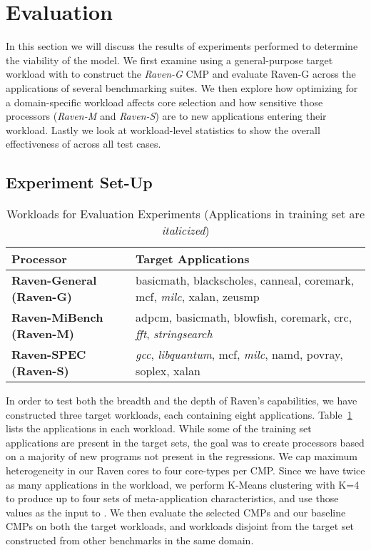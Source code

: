 

\section{Evaluation}
\label{sec:evaluation}

In this section we will discuss the results of experiments performed
to determine the viability of the \Ravan{} model. We first examine
using a general-purpose target workload with \blackBox{} to construct
the \emph{Raven-G} CMP and evaluate Raven-G across the applications of
several benchmarking suites.  We then explore how optimizing for a
domain-specific workload affects core selection and how sensitive
those processors (\emph{Raven-M} and \emph{Raven-S}) are to new
applications entering their workload. Lastly we look at workload-level
statistics to show the overall effectiveness of \Ravan{} across all
test cases.

\subsection{Experiment Set-Up}

\begin{table}[h!]
   \centering
   \begin{tabular}{|p{1.5in}|p{1.5in}|}
	\hline
	\textbf{Processor} & \textbf{Target Applications}\\
	\hline
	\textbf{Raven-General (Raven-G)} & basicmath, blackscholes, canneal, coremark, mcf, \emph{milc}, xalan, zeusmp\\
	\hline
	\textbf{Raven-MiBench (Raven-M)} & adpcm, basicmath, blowfish, coremark, crc, \emph{fft}, \emph{stringsearch}\\
	\hline
        \textbf{Raven-SPEC (Raven-S)} & \emph{gcc}, \emph{libquantum}, mcf, \emph{milc}, namd, povray, soplex, xalan\\
	\hline
   \end{tabular}
   \caption{Workloads for Evaluation Experiments (Applications in training set are \emph{italicized})}
   \label{table:targets}
\end{table}


In order to test both the breadth and the depth of Raven's
capabilities, we have constructed three target workloads, each
containing eight applications. Table~\ref{table:targets} lists the
applications in each workload. While some of the training set
applications are present in the target sets, the goal was to create
processors based on a majority of new programs not present in the
regressions. We cap maximum heterogeneity in our Raven cores to four
core-types per \Ravan{} CMP. Since we have twice as many applications
in the workload, we perform K-Means clustering with K=4 to produce up
to four sets of meta-application characteristics, and use those values
as the input to \blackBox{}.  We then evaluate the selected \Ravan{}
CMPs and our baseline CMPs on both the target workloads, and workloads disjoint from the target set constructed from other benchmarks in the same domain.

